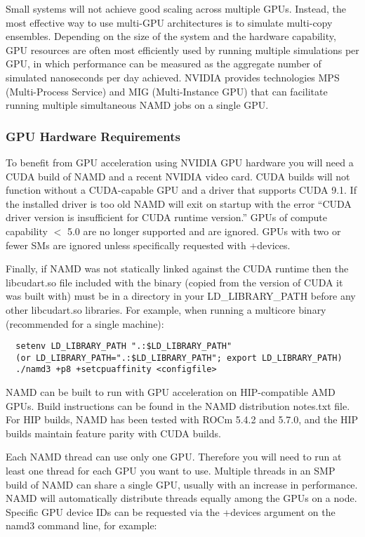 Small systems will not achieve good scaling across multiple GPUs.
Instead, the most effective way to use multi-GPU architectures is to
simulate multi-copy ensembles.
Depending on the size of the system and the hardware capability,
GPU resources are often most efficiently used by running
multiple simulations per GPU,
in which performance can be measured as the aggregate number
of simulated nanoseconds per day achieved.
NVIDIA provides technologies MPS (Multi-Process Service)
and MIG (Multi-Instance GPU) that can facilitate running
multiple simultaneous NAMD jobs on a single GPU.


\subsubsection{GPU Hardware Requirements}

To benefit from GPU acceleration using NVIDIA GPU hardware
you will need a CUDA build of NAMD and a recent NVIDIA video card.
CUDA builds will not function
without a CUDA-capable GPU and a driver that supports CUDA 9.1.  If the
installed driver is too old NAMD will exit on startup with the error
``CUDA driver version is insufficient for CUDA runtime version.''
GPUs of compute capability $<$ 5.0 are no longer supported and are ignored.
GPUs with two or fewer SMs are ignored unless specifically
requested with +devices.

Finally, if NAMD was not statically linked against the CUDA runtime
then the libcudart.so file included with the binary (copied from
the version of CUDA it was built with) must be in a directory in your
LD\_LIBRARY\_PATH before any other libcudart.so libraries.  For example,
when running a multicore binary (recommended for a single machine):

\begin{verbatim}
  setenv LD_LIBRARY_PATH ".:$LD_LIBRARY_PATH"
  (or LD_LIBRARY_PATH=".:$LD_LIBRARY_PATH"; export LD_LIBRARY_PATH)
  ./namd3 +p8 +setcpuaffinity <configfile>
\end{verbatim}

NAMD can be built to run with GPU acceleration
on HIP-compatible AMD GPUs. Build instructions can be
found in the NAMD distribution notes.txt file.
For HIP builds, NAMD has been tested with ROCm 5.4.2 and 5.7.0,
and the HIP builds maintain feature parity with CUDA builds.

Each NAMD thread can use only one GPU.  Therefore you will need to run
at least one thread for each GPU you want to use.
Multiple threads in an SMP build of NAMD
can share a single GPU, usually with an increase in performance.  NAMD
will automatically distribute threads equally among the GPUs on a node.
Specific GPU device IDs can be requested via the +devices argument on
the namd3 command line, for example:

